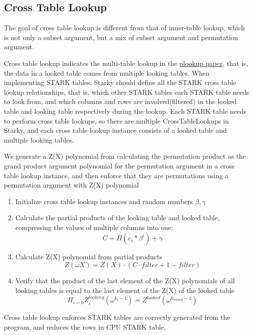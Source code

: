\subsection{Cross Table Lookup}\label{section: cross-table-lookup}

The goal of cross table lookup is different from that of inner-table lookup, which is not only a subset argument, but a mix of subset argument and permutation argument.

Cross table lookup indicates the multi-table lookup in the \href{https://eprint.iacr.org/2020/315.pdf}{plookup paper}, that is, the data in a looked table comes from multiple looking tables. When implementing STARK tables, Starky should define all the STARK cross table lookup relationships, that is, which other STARK tables each STARK table needs to look from, and which columns and rows are involved(filtered) in the looked table and looking table respectively during the lookup. Each STARK table needs to perform cross table lookups, so there are multiple CrossTableLookups in Starky, and each cross table lookup instance consists of a looked table and multiple looking tables.

We generate a Z(X) polynomial from calculating the permutation product as the grand product argument polynomial for the permutation argument in a cross table lookup instance, and then enforce that they are permutations using a permutation argument with Z(X) polynomial

\begin{enumerate}
    \item Initialize cross table lookup instances and random numbers $\beta, \gamma$
    \item Calculate the partial products of the looking table and looked table, compressing the values of multiple columns into one:$$C = \Pi(c_i * \beta^i) + \gamma$$
    \item Calculate Z(X) polynomial from partial products $$Z(\omega X) = Z(X)\cdot (C \cdot filter + 1 - filter)$$
    \item Verify that the product of the last element of the Z(X) polynomials of all looking tables is equal to the last element of the Z(X) of the looked table
    $$\Pi_{i=0} Z^{looking}_{i}(\omega^{k_i-1}) = Z^{looked}(\omega^{k_{looked}-1})$$
\end{enumerate}

Cross table lookup enforces STARK tables are correctly generated from the program, and reduces the rows in CPU STARK table.
